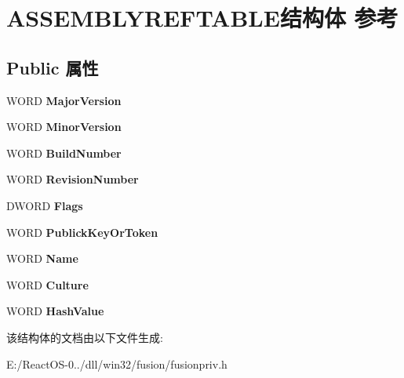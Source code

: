 \hypertarget{struct_a_s_s_e_m_b_l_y_r_e_f_t_a_b_l_e}{}\section{A\+S\+S\+E\+M\+B\+L\+Y\+R\+E\+F\+T\+A\+B\+L\+E结构体 参考}
\label{struct_a_s_s_e_m_b_l_y_r_e_f_t_a_b_l_e}
\subsection*{Public 属性}
\begin{DoxyCompactItemize}
\item 
\mbox{\label{struct_a_s_s_e_m_b_l_y_r_e_f_t_a_b_l_e_aee9310ef547a9567ff6a76f71279697e}} 
W\+O\+RD {\bfseries Major\+Version}
\item 
\mbox{\label{struct_a_s_s_e_m_b_l_y_r_e_f_t_a_b_l_e_a35d85186829d745d267c247cb6356570}} 
W\+O\+RD {\bfseries Minor\+Version}
\item 
\mbox{\label{struct_a_s_s_e_m_b_l_y_r_e_f_t_a_b_l_e_a71d18868d62e0193347c2fd855e47338}} 
W\+O\+RD {\bfseries Build\+Number}
\item 
\mbox{\label{struct_a_s_s_e_m_b_l_y_r_e_f_t_a_b_l_e_ab70ce241412f55bf08aea1fb071c5e66}} 
W\+O\+RD {\bfseries Revision\+Number}
\item 
\mbox{\label{struct_a_s_s_e_m_b_l_y_r_e_f_t_a_b_l_e_abd2ffe511c542a8bd41392ece3a7b296}} 
D\+W\+O\+RD {\bfseries Flags}
\item 
\mbox{\label{struct_a_s_s_e_m_b_l_y_r_e_f_t_a_b_l_e_a12b448a16e9a7549cd0d607b5b046c95}} 
W\+O\+RD {\bfseries Publick\+Key\+Or\+Token}
\item 
\mbox{\label{struct_a_s_s_e_m_b_l_y_r_e_f_t_a_b_l_e_ac25863612c9d2bb78ce3ccd569c77a4a}} 
W\+O\+RD {\bfseries Name}
\item 
\mbox{\label{struct_a_s_s_e_m_b_l_y_r_e_f_t_a_b_l_e_a9a056f17ba222a30f4a72569d4d6c683}} 
W\+O\+RD {\bfseries Culture}
\item 
\mbox{\label{struct_a_s_s_e_m_b_l_y_r_e_f_t_a_b_l_e_a94ca19fc0066c45fb3b721c6ed7c517f}} 
W\+O\+RD {\bfseries Hash\+Value}
\end{DoxyCompactItemize}


该结构体的文档由以下文件生成\+:\begin{DoxyCompactItemize}
\item 
E\+:/\+React\+O\+S-\/0../dll/win32/fusion/fusionpriv.\+h\end{DoxyCompactItemize}
